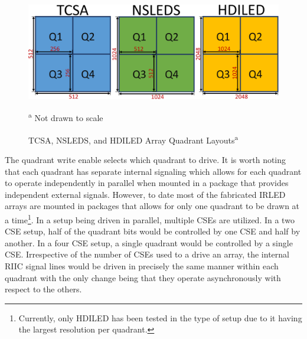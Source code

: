     \begin{figure}
        \centering
        \includegraphics[width=1.0\textwidth]{fig/tcsa_nsleds_hdiled_quads.pdf}
        \caption[TCSA, NSLEDS, and HDILED Array Quadrant Layouts]{TCSA, NSLEDS, and HDILED Array Quadrant Layouts\textsuperscript{a}}
        \vspace{-8px}
        \footnotesize\textsuperscript{a} Not drawn to scale
        \label{fig:tcsa_nsleds_hdiled_quads}
    \end{figure}

    The quadrant write enable selects which quadrant to drive. It is worth noting that each quadrant has separate internal signaling which allows for each quadrant to operate independently in parallel when mounted in a package that provides independent external signals. However, to date most of the fabricated IRLED arrays are mounted in packages that allows for only one quadrant to be drawn at a time\footnote{Currently, only HDILED has been tested in the type of setup\cite{lassiter1, LassiterEtAl2019_1, LassiterEtAl2019_2, lassiter3} due to it having the largest resolution per quadrant.}. In a setup being driven in parallel, multiple CSEs are utilized. In a two CSE setup, half of the quadrant bits would be controlled by one CSE and half by another. In a four CSE setup, a single quadrant would be controlled by a single CSE. Irrespective of the number of CSEs used to a drive an array, the internal RIIC signal lines would be driven in precisely the same manner within each quadrant with the only change being that they operate asynchronously with respect to the others.

